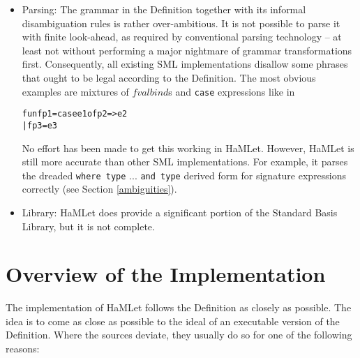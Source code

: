 \documentclass[twoside,titlepage]{article}
\begin{document}
\begin{itemize}

\item Parsing: The grammar in the Definition together with its informal disambiguation rules is rather over-ambitious. It is not possible to parse it with finite look-ahead, as required by conventional parsing technology -- at least not without performing a major nightmare of grammar transformations first. Consequently, all existing SML implementations disallow some phrases that ought to be legal according to the Definition. The most obvious examples are mixtures of $\mathit{fvalbind}$s and {\tt case} expressions like in

\begin{quoting}
\begin{alltt}
fun f p1 = case e1 of p2 => e2
  | f p3 = e3
\end{alltt}
\end{quoting}

No effort has been made to get this working in HaMLet. However, HaMLet is still more accurate than other SML implementations. For example, it parses the dreaded {\tt where type} ... {\tt and type} derived form for signature expressions correctly (see Section \ref{ambiguities}).


\item Library: HaMLet does provide a significant portion of the Standard Basis Library, but it is not complete.
\end{itemize}



\section{Overview of the Implementation}
\label{implementationoverview}

The implementation of HaMLet follows the Definition as closely as possible. The idea is to come as close as possible to the ideal of an executable version of the Definition. Where the sources deviate, they usually do so for one of the following reasons:
\end{document}
